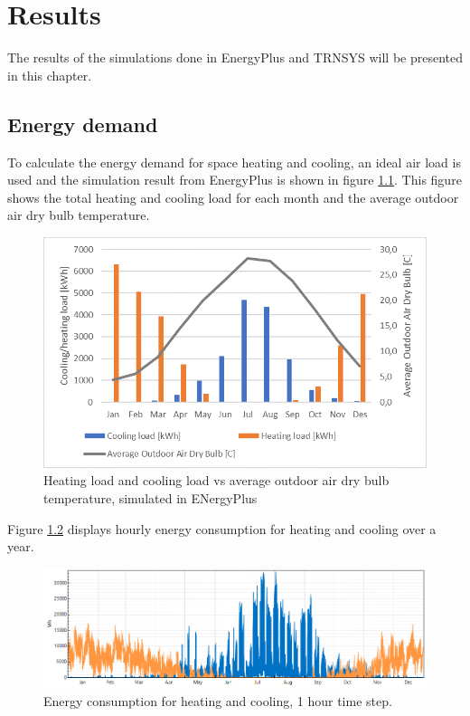 \chapter{Results} %
The results of the simulations done in EnergyPlus and TRNSYS will be presented in this chapter.

\section{Energy demand}
To calculate the energy demand for space heating and cooling, an ideal air load is used and the simulation result from EnergyPlus is shown in figure \ref{fig:hd}. This figure shows the total heating and cooling load for each month and the average outdoor air dry bulb temperature. 

\begin{figure}[h!]
    \centering
    \includegraphics[scale=0.8]{vedlegg/combigraph.png}
    \caption{Heating load and cooling load vs average outdoor air dry bulb temperature, simulated in ENergyPlus}
    \label{fig:hd}
\end{figure}

Figure \ref{fig:ldch} displays hourly energy consumption for heating and cooling over a year. 

\begin{figure}[h!]
    \centering
    \includegraphics[scale=0.5]{vedlegg/coolheat.png}
    \caption{Energy consumption for heating and cooling, 1 hour time step.}
    \label{fig:ldch}
\end{figure}

